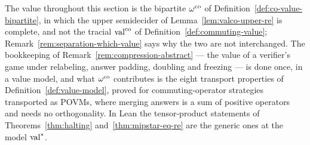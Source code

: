 \begin{remark}
\label{rem:mipco-route}
The value throughout this section is the bipartite $\omega^{\mathrm{co}}$ of
Definition~\ref{def:co-value-bipartite}, in which the upper semidecider of
Lemma~\ref{lem:valco-upper-re} is complete, and not the tracial $\mathrm{val}^{\mathrm{co}}$ of
Definition~\ref{def:commuting-value}; Remark~\ref{rem:separation-which-value} says why the
two are not interchanged. The bookkeeping of Remark~\ref{rem:compression-abstract} --- the
value of a verifier's game under relabeling, answer padding, doubling and freezing --- is
done once, in a value model, and what $\omega^{\mathrm{co}}$ contributes is the eight transport
properties of Definition~\ref{def:value-model}, proved for commuting-operator strategies
transported as POVMs, where merging answers is a sum of positive operators and needs no
orthogonality. In Lean the tensor-product statements of Theorems~\ref{thm:halting}
and~\ref{thm:mipstar-eq-re} are the generic ones at the model $\mathrm{val}^*$.


\end{remark}
